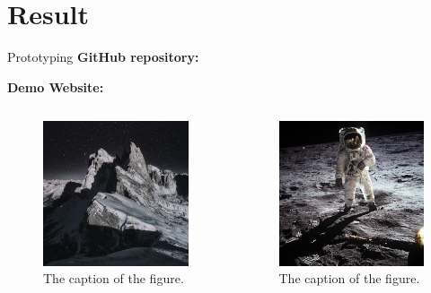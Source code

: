 \documentclass[presentation, aspectratio=169]{beamer}
\begin{document}
\section{Result} 
			
\begin{frame}{Prototyping}
	\textbf{GitHub repository:} \url{}
																
	\textbf{Demo Website:} \url{}
							
	\begin{columns}
		\begin{figure}
			\centering
			\includegraphics[width=.8\textwidth]{samples1.png}
			\caption{The caption of the figure.}
		\end{figure}	
		\begin{figure}
			\centering
			\includegraphics[width=.8\textwidth]{samples2.png}
			\caption{The caption of the figure.}
		\end{figure}
	\end{columns}
	\note{}
\end{frame}
\end{document}
